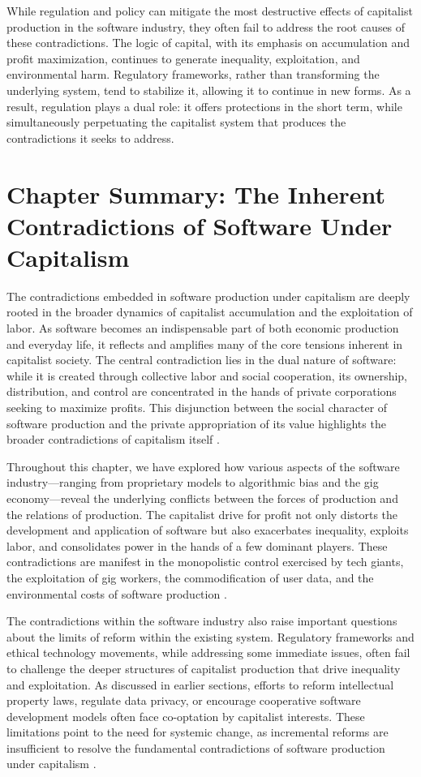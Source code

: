 While regulation and policy can mitigate the most destructive effects of capitalist production in the software industry, they often fail to address the root causes of these contradictions. The logic of capital, with its emphasis on accumulation and profit maximization, continues to generate inequality, exploitation, and environmental harm. Regulatory frameworks, rather than transforming the underlying system, tend to stabilize it, allowing it to continue in new forms. As a result, regulation plays a dual role: it offers protections in the short term, while simultaneously perpetuating the capitalist system that produces the contradictions it seeks to address.

\section{Chapter Summary: The Inherent Contradictions of Software Under Capitalism}

The contradictions embedded in software production under capitalism are deeply rooted in the broader dynamics of capitalist accumulation and the exploitation of labor. As software becomes an indispensable part of both economic production and everyday life, it reflects and amplifies many of the core tensions inherent in capitalist society. The central contradiction lies in the dual nature of software: while it is created through collective labor and social cooperation, its ownership, distribution, and control are concentrated in the hands of private corporations seeking to maximize profits. This disjunction between the social character of software production and the private appropriation of its value highlights the broader contradictions of capitalism itself \cite[pp.~382-384]{marx1976}.

Throughout this chapter, we have explored how various aspects of the software industry—ranging from proprietary models to algorithmic bias and the gig economy—reveal the underlying conflicts between the forces of production and the relations of production. The capitalist drive for profit not only distorts the development and application of software but also exacerbates inequality, exploits labor, and consolidates power in the hands of a few dominant players. These contradictions are manifest in the monopolistic control exercised by tech giants, the exploitation of gig workers, the commodification of user data, and the environmental costs of software production \cite[pp.~45-47]{fuchs2015}.

The contradictions within the software industry also raise important questions about the limits of reform within the existing system. Regulatory frameworks and ethical technology movements, while addressing some immediate issues, often fail to challenge the deeper structures of capitalist production that drive inequality and exploitation. As discussed in earlier sections, efforts to reform intellectual property laws, regulate data privacy, or encourage cooperative software development models often face co-optation by capitalist interests. These limitations point to the need for systemic change, as incremental reforms are insufficient to resolve the fundamental contradictions of software production under capitalism \cite[pp.~245-247]{foster2009}.

